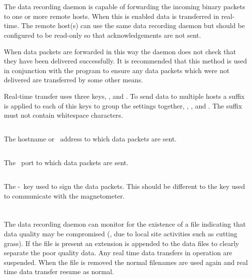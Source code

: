 \section{}

The data recording daemon is capable of forwarding the incoming binary
packets to one or more remote hosts. When this is enabled data is
transferred in real-time. The remote host(s) can use the same data
recording daemon but should be configured to be read-only so that
acknowledgements are not sent.

When data packets are forwarded in this way the daemon does not check
that they have been delivered successfully. It is recommended that
this method is used in conjunction with the 
program to ensure any data packets which were not delivered are
transferred by some other means.

Real-time transfer uses three keys, ,
 and . To send data to multiple
hosts a suffix is applied to each of this keys to group the settings
together, \eg, ,  and
. The suffix must not contain whitespace characters.

\subsection{}
The hostname or \ip\ address to which data packets are sent.

\subsection{}
The \udp\ port to which data packets are sent.

\subsection{}
The \hmac-\mdfive\ key used to sign the data packets. This should be
different to the key used to communicate with the magnetometer.

\section{\code{[dataqualitymonitor]}}

The data recording daemon can monitor for the existence of a file
indicating that data quality may be compromised (\eg, due to local
site activities such as cutting grass). If the file is present an
extension is appended to the data files to clearly separate the poor
quality data. Any real time data transfers in operation are
suspended. When the file is removed the normal filenames are used
again and real time data transfer resume as normal.

